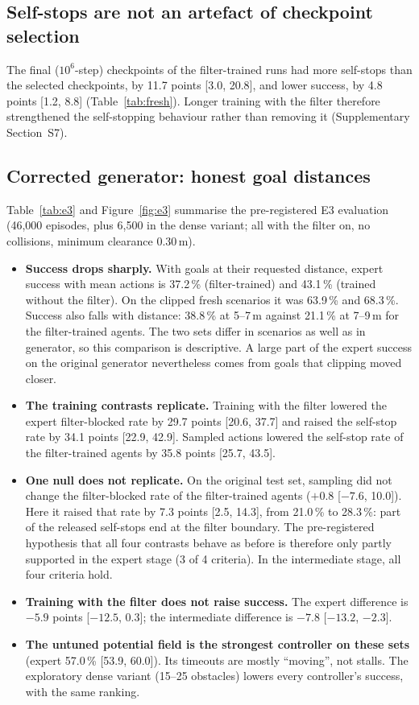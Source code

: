 \documentclass[11pt]{article}
\theoremstyle{definition}
\theoremstyle{remark}
\begin{document}
\subsection{Self-stops are not an artefact of checkpoint selection}
The final ($10^6$-step) checkpoints of the filter-trained runs had more self-stops than the selected checkpoints, by 11.7 points [3.0, 20.8], and lower success, by 4.8 points [1.2, 8.8] (Table~\ref{tab:fresh}). Longer training with the filter therefore strengthened the self-stopping behaviour rather than removing it (Supplementary Section~S7).

\subsection{Corrected generator: honest goal distances}\label{sec:e3}
Table~\ref{tab:e3} and Figure~\ref{fig:e3} summarise the pre-registered E3 evaluation (46{,}000 episodes, plus 6{,}500 in the dense variant; all with the filter on, no collisions, minimum clearance 0.30\,m).
\begin{itemize}
  \item \textbf{Success drops sharply.} With goals at their requested distance, expert success with mean actions is 37.2\,\% (filter-trained) and 43.1\,\% (trained without the filter). On the clipped fresh scenarios it was 63.9\,\% and 68.3\,\%. Success also falls with distance: 38.8\,\% at 5--7\,m against 21.1\,\% at 7--9\,m for the filter-trained agents. The two sets differ in scenarios as well as in generator, so this comparison is descriptive. A large part of the expert success on the original generator nevertheless comes from goals that clipping moved closer.
  \item \textbf{The training contrasts replicate.} Training with the filter lowered the expert filter-blocked rate by 29.7 points [20.6, 37.7] and raised the self-stop rate by 34.1 points [22.9, 42.9]. Sampled actions lowered the self-stop rate of the filter-trained agents by 35.8 points [25.7, 43.5].
  \item \textbf{One null does not replicate.} On the original test set, sampling did not change the filter-blocked rate of the filter-trained agents ($+0.8$ [$-7.6$, 10.0]). Here it raised that rate by 7.3 points [2.5, 14.3], from 21.0\,\% to 28.3\,\%: part of the released self-stops end at the filter boundary. The pre-registered hypothesis that all four contrasts behave as before is therefore only partly supported in the expert stage (3 of 4 criteria). In the intermediate stage, all four criteria hold.
  \item \textbf{Training with the filter does not raise success.} The expert difference is $-5.9$ points [$-12.5$, 0.3]; the intermediate difference is $-7.8$ [$-13.2$, $-2.3$].
  \item \textbf{The untuned potential field is the strongest controller on these sets} (expert 57.0\,\% [53.9, 60.0]). Its timeouts are mostly ``moving'', not stalls. The exploratory dense variant (15--25 obstacles) lowers every controller's success, with the same ranking.
\end{itemize}
\end{document}
